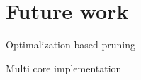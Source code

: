 
\chapter{Future work}\label{chapter:future-work}
Optimalization based pruning

Multi core implementation

